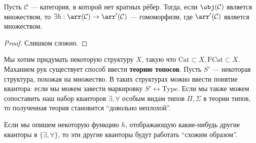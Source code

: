 \begin{statement}
    Пусть \(\mathcal{C}\) --- категория, в которой нет кратных рёбер. Тогда, если \(\obj(\mathcal{C})\) является множеством, то \(\exists h : \arr(\mathcal{C}) \to \arr'(\mathcal{C})\) --- гомоморфизм, где \(\arr'(\mathcal{C})\) является множеством.
\end{statement}
\begin{proof}
    Слишком сложно.
\end{proof}

Мы хотим придумать некоторую структуру \(X\), такую что \(\mathrm{Cat} \subset X, \mathrm{FCat} \subset X\). Маханием рук существует способ ввести \textbf{теорию топосов}. Пусть \(S'\) --- некоторая структура, похожая на множество. В таких структурах можно ввести понятие квантора: если мы можем завести маркировку \(S' \leftrightarrow \mathrm{Type}\). Если мы также можем сопоставить наш набор кванторов \(\exists, \forall\) особым видам типов \(\Pi, \Sigma\) в теории типов, то полученная теория становится ``довольно неплохой''.

Если мы опишем некоторую функцию \(h\), отображающую какие-нибудь другие кванторы в \(\{\exists, \forall\}\), то эти другие кванторы будут работать ``схожим образом''.
